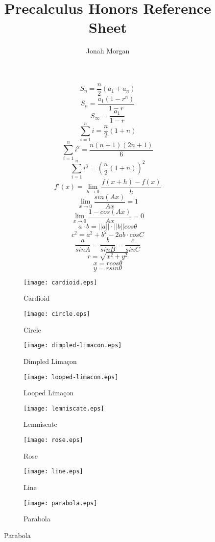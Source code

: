 \documentclass{article}
\begin{document}
\vspace*{\fill}
\begin{minipage}{\textwidth}
\title{Precalculus Honors Reference Sheet}
\author{Jonah Morgan}
\maketitle
\begin{multicols}{5}
\[
S_n = \frac{n}2(a_1 + a_n)
\]
\[
S_n = \frac{a_1(1 - r^n)}{1 - r}
\]
\[
S_\infty = \frac{a_1}{1 - r}
\]
\columnbreak
\[
\sum^n_{i = 1} i = \frac{n}2(1 + n)
\]
\[
\sum^n_{i = 1} i^2 = \frac{n(n + 1)(2n + 1)}6
\]
\[
\sum^n_{i = 1} i^3 = (\frac{n}2(1 + n))^2
\]
\columnbreak
\[
f'(x) = \lim_{h \to 0} \frac{f(x + h) - f(x)}h
\]
\[
\lim_{x \to 0} \frac{sin(Ax)}{Ax} = 1
\]
\[
\lim_{x \to 0} \frac{1 - cos(Ax)}{Ax} = 0
\]
\columnbreak
\[
a \cdot b = ||a|| \cdot ||b|| \dot cos \theta
\]
\[
c^2 = a^2 + b^2 -2ab \cdot {cos C}
\]
\[
\frac{a}{sin A} = \frac{b}{sin B} = \frac{c}{sin C}
\]
\columnbreak
\[
r = \sqrt{x^2 + y^2}
\]
\[
x = r cos \theta
\]
\[
y = r sin \theta
\]
\end{multicols}
\end{minipage}
\begin{figure}[h]
\begin{subfigure}{.2\textwidth}
\caption{Cardioid}
\texttt{[image: cardioid.eps]}
\end{subfigure}
\hfill
\begin{subfigure}{.2\textwidth}
\caption{Circle}
\texttt{[image: circle.eps]}
\end{subfigure}
\hfill
\begin{subfigure}{.2\textwidth}
\caption{Dimpled Limaçon}
\texttt{[image: dimpled-limacon.eps]}
\end{subfigure}
\hfill
\begin{subfigure}{.2\textwidth}
\caption{Looped Limaçon}
\texttt{[image: looped-limacon.eps]}
\end{subfigure}
\hfill
\begin{subfigure}{.2\textwidth}
\caption{Lemniscate}
\texttt{[image: lemniscate.eps]}
\end{subfigure}
\hfill
\begin{subfigure}{.2\textwidth}
\caption{Rose}
\texttt{[image: rose.eps]}
\end{subfigure}
\hfill
\begin{subfigure}{.2\textwidth}
\caption{Line}
\texttt{[image: line.eps]}
\end{subfigure}
\hfill
\begin{subfigure}{.2\textwidth}
\caption{Parabola}
\texttt{[image: parabola.eps]}
\end{subfigure}
\end{figure}
\end{document}
